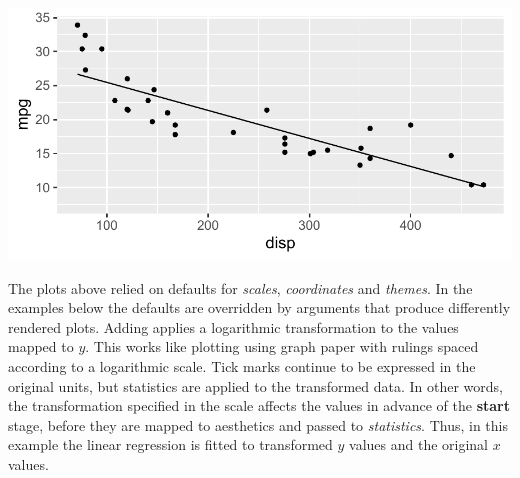 \documentclass[krantz2]{krantz}\usepackage{knitr}
\begin{document}
\begin{knitrout}\footnotesize
{}\color{fgcolor}\begin{kframe}
\begin{alltt}
\hlstd{(} 
        \hlstd{=} \hlstd{(}    \hlopt{+}
  \hlstd{()} \hlopt{+}
  \hlstd{(} \hlstd{=} \hlstd{,}  \hlstd{=} \hlstd{,}   \hlopt{~} 
\end{alltt}
\end{kframe}

{\centering \includegraphics[width=.7\textwidth]{figure/pos-ggplot-basics-05-1} 

}


\end{knitrout}

The plots above relied on defaults for \emph{scales}, \emph{coordinates} and \emph{themes}. In the examples below the defaults are overridden by arguments that produce differently rendered plots. Adding  applies a logarithmic transformation to the values mapped to $y$. This works like plotting using graph paper with rulings spaced according to a logarithmic scale. Tick marks continue to be expressed in the original units, but statistics are applied to the transformed data. In other words, the transformation specified in the scale affects the values in advance of the \textbf{start} stage, before they are mapped to aesthetics and passed to \emph{statistics}. Thus, in this example the linear regression is fitted to  transformed $y$ values and the original $x$ values.%
\end{document}
